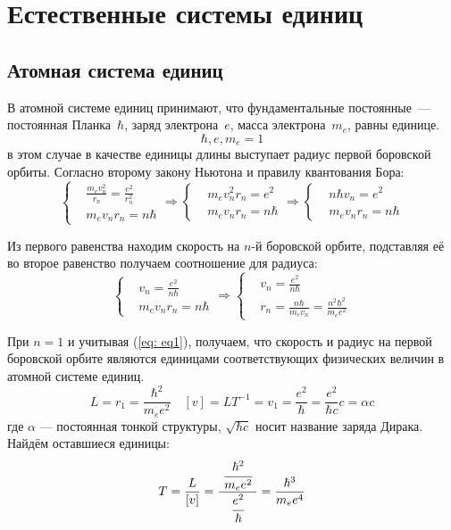 \documentclass[a4paper,14pt]{extarticle} %
\begin{document}
	\tableofcontents
	\section{Естественные системы единиц}
	\subsection{Атомная система единиц}
	
	В атомной системе единиц принимают, что фундаментальные постоянные~--- постоянная Планка~\(\hbar\), заряд электрона~\(e\), масса электрона~\(m_e\), равны единице.
	\begin{equation}\label{eq: eq1}
	\hbar, e, m_e = 1
	\end{equation}
	в этом случае в качестве единицы длины выступает радиус первой боровской орбиты. Согласно второму закону Ньютона и правилу квантования Бора:
	\begin{equation*}
	\left\{
	\begin{aligned}
		& \frac{m_e v_n^2}{r_n} = \frac{e^2}{r_n^2} \\
		& m_e v_n r_n = n\hbar
	\end{aligned}
	\right.
	\Rightarrow
	\left\{
	\begin{aligned}
		& m_e v_n^2 r_n = e^2 \\
		& m_e v_n r_n = n\hbar
	\end{aligned}
	\right.	
	\Rightarrow
	\left\{
	\begin{aligned}
		& n \hbar v_n = e^2 \\
		& m_e v_n r_n = n\hbar
	\end{aligned}
	\right.	
	\end{equation*}
	
	Из первого равенства находим скорость на \(n\)-й боровской орбите, подставляя её во второе равенство получаем соотношение для радиуса:
	\begin{equation*}
	\left\{
	\begin{aligned}
		& v_n = \frac{e^2}{n\hbar} \\
		& m_e v_n r_n = n\hbar
	\end{aligned}
	\right.	
	\Rightarrow
	\left\{
	\begin{aligned}
		& v_n = \frac{e^2}{n\hbar} \\
		& r_n = \frac{n\hbar}{m_e v_n} = \frac{n^2\hbar^2}{m_e e^2}
	\end{aligned}
	\right.	
	\end{equation*}
	
	При \(n = 1\) и учитывая (\ref{eq: eq1}), получаем, что скорость и радиус на первой боровской орбите являются единицами соответствующих физических величин в атомной системе единиц.
	\[
	L = r_1 = \frac{\hbar^2}{m_e e^2} \quad
	[v] = LT^{-1} = v_1 = \frac{e^2}{\hbar} = \frac{e^2}{\hbar c} c = \alpha c
	\]
	где \(\alpha\) --- постоянная тонкой структуры, \(\sqrt{\hbar c}\) носит название заряда Дирака. Найдём оставшиеся единицы:
	\[
	T = \frac{L}{[v]} = \frac{~\cfrac{\hbar^2}{m_e e^2}~}{\cfrac{e^2}{\hbar}} = \frac{\hbar^3}{m_e e^4}
	\]
	
\end{document}

